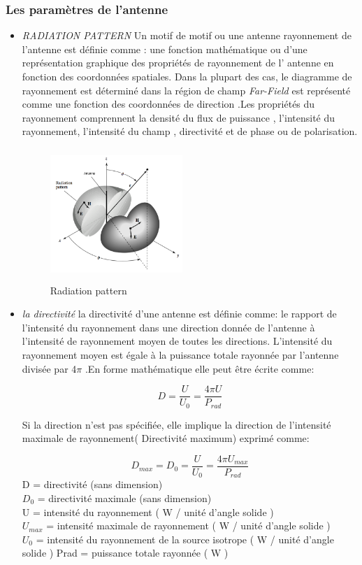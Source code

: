 \documentclass[11pt, a4paper, twoside]{book}
\begin{document}
\subsubsection{Les paramètres de l'antenne}
\begin{itemize}
\item \emph{RADIATION PATTERN}
Un motif de motif ou une antenne rayonnement de l'antenne est définie comme : une fonction mathématique ou d'une représentation graphique des propriétés de rayonnement de l' antenne en fonction des coordonnées spatiales. Dans la plupart des cas, le diagramme de rayonnement est déterminé dans la région de champ \emph{Far-Field} est représenté comme une fonction des coordonnées de direction .Les propriétés du rayonnement comprennent la densité du flux de puissance , l'intensité du rayonnement, l'intensité du champ , directivité et de phase ou de polarisation.
\begin{figure}[H]
\centering
\includegraphics[width=5cm,height=5cm]{radpa}
\caption{Radiation pattern}
\end{figure}
\item \emph{la directivité} la directivité d'une antenne est définie comme: le rapport de l'intensité du rayonnement dans une direction donnée de l'antenne à l'intensité de rayonnement moyen de toutes les directions. L'intensité du rayonnement moyen est égale à la puissance totale rayonnée par l'antenne divisée par 4\(\pi\) .En forme mathématique elle peut être écrite comme:

\begin{equation}
D = \dfrac{U}{U_{0}} = \dfrac{4 \pi U}{P_{rad}}
\end{equation}

Si la direction n'est pas spécifiée, elle implique la direction de l'intensité maximale de rayonnement( Directivité maximum) exprimé comme:

\begin{equation}
D_{max} = D_{0} = \dfrac{U}{U_{0}} = \dfrac{4 \pi U_{max}}{P_{rad}}
\end{equation}
D = directivité (sans dimension)\\
\(D_{0}\) = directivité maximale (sans dimension)\\
U = intensité du rayonnement ( W / unité d'angle solide )\\
\(U_{max}\) = intensité maximale de rayonnement ( W / unité d'angle solide )\\
\(U_{0}\) = intensité du rayonnement de la source isotrope ( W / unité d'angle solide ) Prad = puissance totale rayonnée ( W )\\


\end{itemize}
\end{document}
